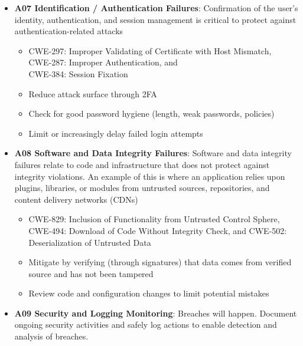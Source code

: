 \documentclass[11pt]{article}
\begin{document}
\begin{itemize}
		\begin{itemize}
			\item CWE-1104: Use of Unmaintained Third-Party Components
			\item Minimize attack surface by removing or disabling unused components
			\item Track inventory of software and follow upstream security notices
			\item Monitor for available patches, if patching is not possible mitigate through firewall or high-level interception
		\end{itemize}
	\item \textbf{A07 Identification / Authentication Failures}: Confirmation of the user's identity, authentication, and session management is critical to protect against authentication-related attacks
		\begin{itemize}
			\item CWE-297: Improper Validating of Certificate with Host Mismatch, \\
			  CWE-287: Improper Authentication, and \\
			  CWE-384: Session Fixation
			\item Reduce attack surface through 2FA
			\item Check for good password hygiene (length, weak passwords, policies)
			\item Limit or increasingly delay failed login attempts
		\end{itemize}
	\item \textbf{A08 Software and Data Integrity Failures}: Software and data integrity failures relate to code and infrastructure that does not protect against integrity violations. An example of this is where an application relies upon plugins, libraries, or modules from untrusted sources, repositories, and content delivery networks (CDNs)
		\begin{itemize}
			\item CWE-829: Inclusion of Functionality from Untrusted Control Sphere, \\
			  CWE-494: Download of Code Without Integrity Check, and
			  CWE-502: Deserialization of Untrusted Data
			\item Mitigate by verifying (through signatures) that data comes from verified source and has not been tampered
			\item Review code and configuration changes to limit potential mistakes
		\end{itemize}
	\item \textbf{A09 Security and Logging Monitoring}: Breaches will happen. Document ongoing security activities and safely log actions to enable detection and analysis of breaches. 

\end{itemize}
\end{document}
